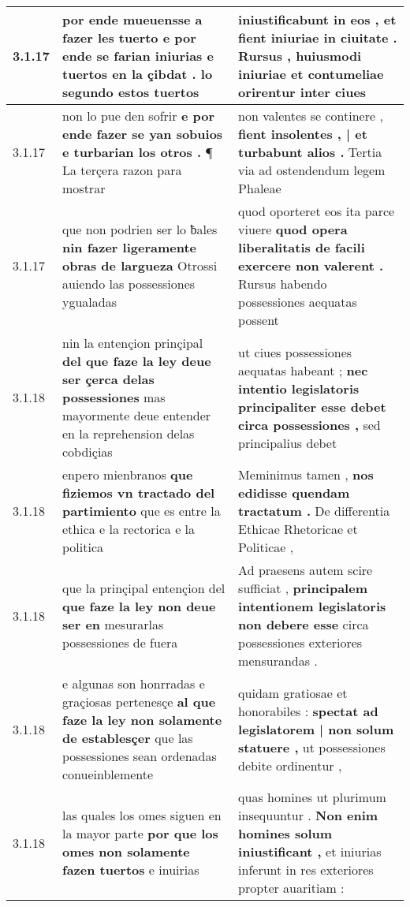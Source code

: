 \begin{tabular}{|p{1cm}|p{6.5cm}|p{6.5cm}|}
3.1.17 & por ende mueuensse a fazer les tuerto \textbf{ e por ende se farian iniurias e tuertos en la çibdat . } lo segundo estos tuertos & iniustificabunt in eos , \textbf{ et fient iniuriae in ciuitate . } Rursus , huiusmodi iniuriae et contumeliae orirentur inter ciues \\\hline
3.1.17 & non lo pue den sofrir \textbf{ e por ende fazer se yan sobuios e turbarian los otros . } ¶ La terçera razon para mostrar & non valentes se continere , \textbf{ fient insolentes , | et turbabunt alios . } Tertia via ad ostendendum legem Phaleae \\\hline
3.1.17 & que non podrien ser lo ƀales \textbf{ nin fazer ligeramente obras de largueza } Otrossi auiendo las possessiones ygualadas & quod oporteret eos ita parce viuere \textbf{ quod opera liberalitatis de facili exercere non valerent . } Rursus habendo possessiones aequatas possent \\\hline
3.1.18 & nin la entençion prinçipal \textbf{ del que faze la ley deue ser çerca delas possessiones } mas mayormente deue entender en la reprehension delas cobdiçias & ut ciues possessiones aequatas habeant ; \textbf{ nec intentio legislatoris principaliter esse debet circa possessiones , } sed principalius debet \\\hline
3.1.18 & enpero mienbranos \textbf{ que fiziemos vn tractado del partimiento } que es entre la ethica e la rectorica e la politica & Meminimus tamen , \textbf{ nos edidisse quendam tractatum . } De differentia Ethicae Rhetoricae et Politicae , \\\hline
3.1.18 & que la prinçipal entençion del \textbf{ que faze la ley non deue ser en } mesurarlas possessiones de fuera & Ad praesens autem scire sufficiat , \textbf{ principalem intentionem legislatoris non debere esse } circa possessiones exteriores mensurandas . \\\hline
3.1.18 & e algunas son honrradas e graçiosas pertenesçe \textbf{ al que faze la ley non solamente de establesçer } que las possessiones sean ordenadas conueinblemente & quidam gratiosae et honorabiles : \textbf{ spectat ad legislatorem | non solum statuere , } ut possessiones debite ordinentur , \\\hline
3.1.18 & las quales los omes siguen en la mayor parte \textbf{ por que los omes non solamente fazen tuertos } e inuirias & quas homines ut plurimum insequuntur . \textbf{ Non enim homines solum iniustificant , } et iniurias inferunt in res exteriores propter auaritiam : \\\hline

\end{tabular}
